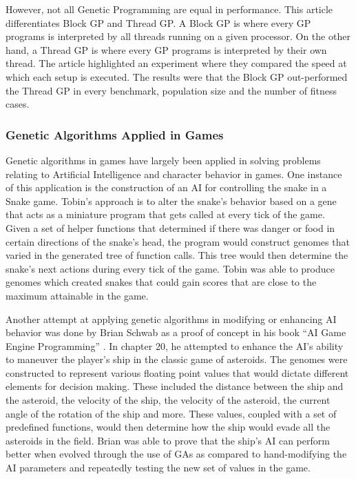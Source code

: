 	However, not all Genetic Programming are equal in performance.  This article  differentiates Block GP and Thread GP\cite{Robbilliard09}.  A Block GP is where every GP programs is
	interpreted by all threads running on a given processor.  On the other hand, a Thread GP is where every GP programs is interpreted by their own thread.  The article 
	highlighted an experiment where they compared the speed at which each setup is executed.  The results were that the Block GP out-performed the Thread GP in every benchmark, 
	population size and the number of fitness cases.

\subsubsection*{Genetic Algorithms Applied in Games}	

	Genetic algorithms in games have largely been applied in solving problems relating to Artificial Intelligence and character behavior in games. One instance of this application 
	is the construction of an AI for controlling the snake in a Snake game\cite{website:Ehlis00}. Tobin's approach is to alter the snake's behavior based on a gene that acts as a miniature 
	program that gets called at every tick of the game. Given a set of helper functions that determined if there was danger or food in certain directions of the snake's head, the program 
	would construct genomes that varied in the generated tree of function calls. This tree would then determine the snake's next actions during every tick of the game. Tobin was able to 
	produce genomes which created snakes that could gain scores that are close to the maximum attainable in the game.  

	Another attempt at applying genetic algorithms in modifying or 
	enhancing AI behavior was done by Brian Schwab as a proof of concept in his book “AI Game Engine Programming” \cite{Schwab04}. In chapter 20, he attempted to enhance the AI's ability to maneuver 
	the player's ship in the classic game of asteroids. The genomes were constructed to represent various floating point values that would dictate different elements for decision making. 
	These included the distance between the ship and the asteroid, the velocity of the ship, the velocity of the asteroid, the current angle of the rotation of the ship and more. 
	These values, coupled with a set of predefined functions, would then determine how the ship would evade all the asteroids in the field. Brian was able to prove that the ship's AI can 
	perform better when evolved through the use of GAs as compared to hand-modifying the AI parameters and repeatedly testing the new set of values in the game.
	
